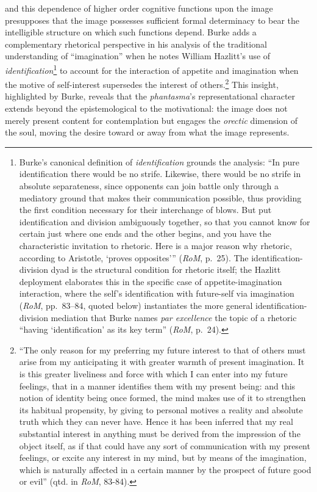 and this dependence of higher order cognitive functions upon the image presupposes that the image possesses sufficient formal determinacy to bear the intelligible structure on which such functions depend. Burke adds a complementary rhetorical perspective in his analysis of the traditional understanding of ``imagination'' when he notes William Hazlitt's use of \textit{identification}\footnote{Burke's canonical definition of \textit{identification} grounds the analysis: ``In pure identification there would be no strife. Likewise, there would be no strife in absolute separateness, since opponents can join battle only through a mediatory ground that makes their communication possible, thus providing the first condition necessary for their interchange of blows. But put identification and division ambiguously together, so that you cannot know for certain just where one ends and the other begins, and you have the characteristic invitation to rhetoric. Here is a major reason why rhetoric, according to Aristotle, `proves opposites''' (\textit{RoM}, p.~25). The identification-division dyad is the structural condition for rhetoric itself; the Hazlitt deployment elaborates this in the specific case of appetite-imagination interaction, where the self's identification with future-self via imagination (\textit{RoM}, pp.~83--84, quoted below) instantiates the more general identification-division mediation that Burke names \textit{par excellence} the topic of a rhetoric ``having `identification' as its key term'' (\textit{RoM}, p.~24).} to account for the interaction of appetite and imagination when the motive of self-interest supersedes the interest of others.\footnote{``The only reason for my preferring my future interest to that of others must arise from my anticipating it with greater warmth of present imagination. It is this greater liveliness and force with which I can enter into my future feelings, that in a manner identifies them with my present being: and this notion of identity being once formed, the mind makes use of it to strengthen its habitual propensity, by giving to personal motives a reality and absolute truth which they can never have. Hence it has been inferred that my real substantial interest in anything must be derived from the impression of the object itself, as if that could have any sort of communication with my present feelings, or excite any interest in my mind, but by means of the imagination, which is naturally affected in a certain manner by the prospect of future good or evil'' (qtd. in \textit{RoM}, 83-84).} This insight, highlighted by Burke, reveals that the \textit{phantasma}'s representational character extends beyond the epistemological to the motivational: the image does not merely present content for contemplation but engages the \textit{orectic} dimension of the soul, moving the desire toward or away from what the image represents. 

